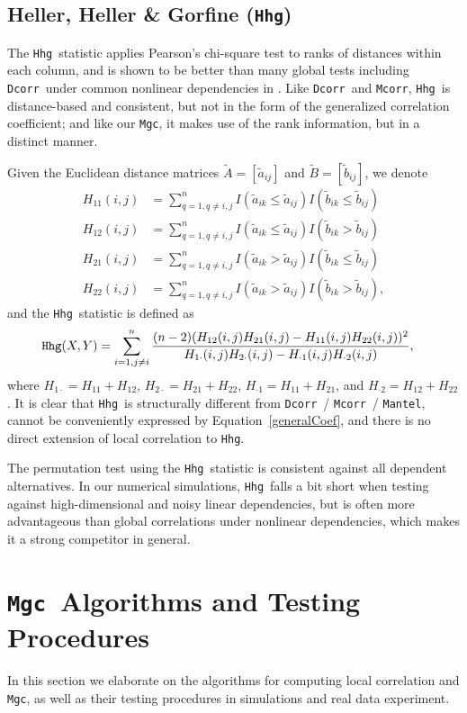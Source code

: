 \documentclass[11pt]{article}
\providecommand{\sct}[1]{{\sc \texttt{#1}}}
\newcommand{\Mgc}{\sct{Mgc}}
\newcommand{\Hhg}{\sct{Hhg}}
\newcommand{\Dcorr}{\sct{Dcorr}}
\newcommand{\Mcorr}{\sct{Mcorr}}
\newcommand{\Mantel}{\sct{Mantel}}
\begin{document}
\subsection{Heller, Heller \& Gorfine (\Hhg)}
\label{appen:hhg}
The \Hhg~statistic applies Pearson's chi-square test to ranks of distances within each column, and is shown to be better than many global tests including \Dcorr~under common nonlinear dependencies in \cite{GorfineHellerHeller2012, HellerGorfine2013}. Like \Dcorr~and \Mcorr, \Hhg~is distance-based and consistent, but not in the form of the generalized correlation coefficient; and like our \Mgc, it makes use of the rank information, but in a distinct manner.

Given the Euclidean distance matrices $\tilde{A}=[\tilde{a}_{ij}]$ and $\tilde{B}=[\tilde{b}_{ij}]$, we denote
\begin{align*}
H_{11}(i,j) &= \sum_{q=1,q\neq i,j}^{n}I(\tilde{a}_{ik} \leq \tilde{a}_{ij})I(\tilde{b}_{ik} \leq \tilde{b}_{ij}) \\
H_{12}(i,j) &= \sum_{q=1,q\neq i,j}^{n}I(\tilde{a}_{ik} \leq \tilde{a}_{ij})I(\tilde{b}_{ik} > \tilde{b}_{ij}) \\
H_{21}(i,j) &= \sum_{q=1,q\neq i,j}^{n}I(\tilde{a}_{ik} > \tilde{a}_{ij})I(\tilde{b}_{ik} \leq \tilde{b}_{ij}) \\
H_{22}(i,j) &= \sum_{q=1,q\neq i,j}^{n}I(\tilde{a}_{ik} > \tilde{a}_{ij})I(\tilde{b}_{ik} > \tilde{b}_{ij}),
\end{align*}
and the \Hhg~statistic is defined as
\begin{align*}
\Hhg(X,Y) &= \sum_{i=1,j\neq i}^{n} \frac{(n-2)(H_{12}(i,j)H_{21}(i,j)-H_{11}(i,j)H_{22}(i,j))^2}{H_{1 \cdot}(i,j)H_{2 \cdot}(i,j)-H_{\cdot 1}(i,j)H_{\cdot 2}(i,j)},
\end{align*}
where $H_{1 \cdot}=H_{11}+H_{12}$, $H_{2 \cdot}=H_{21}+H_{22}$, $H_{\cdot 1}=H_{11}+H_{21}$, and $H_{\cdot 2}=H_{12}+H_{22}$. It is clear that \Hhg~is structurally different from \Dcorr~/ \Mcorr~/ \Mantel, cannot be conveniently expressed by Equation~\ref{generalCoef}, and there is no direct extension of local correlation to \Hhg.

The permutation test using the \Hhg~statistic is consistent against all dependent alternatives. In our numerical simulations, \Hhg~falls a bit short when testing against high-dimensional and noisy linear dependencies, but is often more advantageous than global correlations under nonlinear dependencies, which makes it a strong competitor in general.

\section{\Mgc~Algorithms and Testing Procedures}
\label{appen:tests}
In this section we elaborate on the algorithms for computing local correlation and \Mgc, as well as their testing procedures in simulations and real data experiment.
\end{document}
